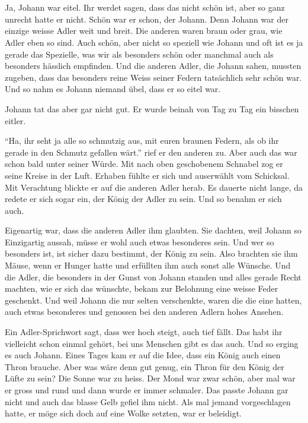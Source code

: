 \chapter*{}
\lettrine[lines=2]{\color{red}J}{}a, Johann war eitel. Ihr werdet sagen, dass das nicht schön ist, aber so ganz unrecht hatte er nicht. Schön war er schon, der Johann. Denn Johann war der einzige weisse Adler weit und breit. Die anderen waren braun oder grau, wie Adler eben so sind. Auch schön, aber nicht so speziell wie Johann und oft ist es ja gerade das Spezielle, was wir als besonders schön oder manchmal auch als besonders hässlich empfinden. Und die anderen Adler, die Johann sahen, mussten zugeben, dass das besonders reine Weiss seiner Federn tatsächlich sehr schön war. Und so nahm es Johann niemand übel, dass er so eitel war. 

Johann tat das aber gar nicht gut. Er wurde beinah von Tag zu Tag ein bisschen eitler. 

\enquote{Ha, ihr seht ja alle so schmutzig aus, mit euren braunen Federn, als ob ihr gerade in den Schmutz gefallen wärt.} rief er den anderen zu. Aber auch das war schon bald unter seiner Würde. Mit nach oben geschobenem Schnabel zog er seine Kreise in der Luft. Erhaben fühlte er sich und auserwählt vom Schicksal. Mit Verachtung blickte er auf die anderen Adler herab. Es dauerte nicht lange, da redete er sich sogar ein, der König der Adler zu sein. Und so benahm er sich auch.

Eigenartig war, dass die anderen Adler ihm glaubten. Sie dachten, weil Johann so Einzigartig aussah, müsse er wohl auch etwas besonderes sein. Und wer so besonders ist, ist sicher dazu bestimmt, der König zu sein. Also brachten sie ihm Mäuse, wenn er Hunger hatte und erfüllten ihm auch sonst alle Wünsche. Und die Adler, die besonders in der Gunst von Johann standen und alles gerade Recht machten, wie er sich das wünschte, bekam zur Belohnung eine weisse Feder geschenkt. Und weil Johann die nur selten verschenkte, waren die die eine hatten, auch etwas besonderes und genossen bei den anderen Adlern hohes Ansehen.

Ein Adler-Sprichwort sagt, dass wer hoch steigt, auch tief fällt. Das habt ihr vielleicht schon einmal gehört, bei uns Menschen gibt es das auch. Und so erging es auch Johann. Eines Tages kam er auf die Idee, dass ein König auch einen Thron brauche. Aber was wäre denn gut genug, ein Thron für den König der Lüfte zu sein? Die Sonne war zu heiss. Der Mond war zwar schön, aber mal war er gross und rund und dann wurde er immer schmaler. Das passte Johann gar nicht und auch das blasse Gelb gefiel ihm nicht. Als mal jemand vorgeschlagen hatte, er möge sich doch auf eine Wolke setzten, war er beleidigt.

